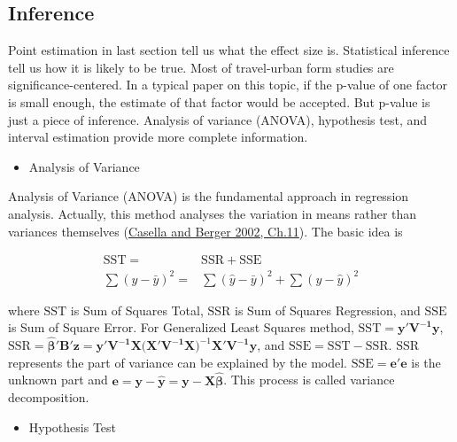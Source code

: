 \documentclass[
  11pt,
  openany]{memoir}
\providecommand{\tightlist}{%
  \setlength{\itemsep}{0pt}\setlength{\parskip}{0pt}}
\begin{document}
\hypertarget{inference}{%
\subsection{Inference}\label{inference}}

Point estimation in last section tell us what the effect size is. Statistical inference tell us how it is likely to be true.
Most of travel-urban form studies are significance-centered. In a typical paper on this topic, if the p-value of one factor is small enough, the estimate of that factor would be accepted.
But p-value is just a piece of inference. Analysis of variance (ANOVA), hypothesis test, and interval estimation provide more complete information.

\begin{itemize}
\tightlist
\item
  Analysis of Variance
\end{itemize}

Analysis of Variance (ANOVA) is the fundamental approach in regression analysis. Actually, this method analyses the variation in means rather than variances themselves (\protect\hyperlink{ref-casellaStatisticalInference2002}{Casella and Berger 2002, Ch.11}). The basic idea is

\begin{equation}
\begin{split}
\mathrm{SST} =& \mathrm{SSR} + \mathrm{SSE}\\
\sum(y-\bar y)^2=&\sum(\hat y-\bar y)^2+\sum(y-\hat y)^2
\end{split}
\label{eq:ss}
\end{equation}

where \(\mathrm{SST}\) is Sum of Squares Total, \(\mathrm{SSR}\) is Sum of Squares Regression, and \(\mathrm{SSE}\) is Sum of Square Error.
For Generalized Least Squares method, \(\mathrm{SST}=\mathbf{y'V^{-1}y}\), \(\mathrm{SSR}= \boldsymbol{\hat\beta'}\mathbf{B'z}=\mathbf{y'V^{-1}X(X'V^{-1}X})^{-1}\mathbf{X'V^{-1}}\mathbf{y}\), and \(\mathrm{SSE}=\mathrm{SST}-\mathrm{SSR}\).
\(\mathrm{SSR}\) represents the part of variance can be explained by the model.
\(\mathrm{SSE}=\mathbf{e'e}\) is the unknown part and \(\mathbf{e}=\mathbf{y}-\mathbf{\hat y}=\mathbf{y}-\mathbf{X}\boldsymbol{\hat\beta}\).
This process is called variance decomposition.

\begin{itemize}
\tightlist
\item
  Hypothesis Test
\end{itemize}
\end{document}
